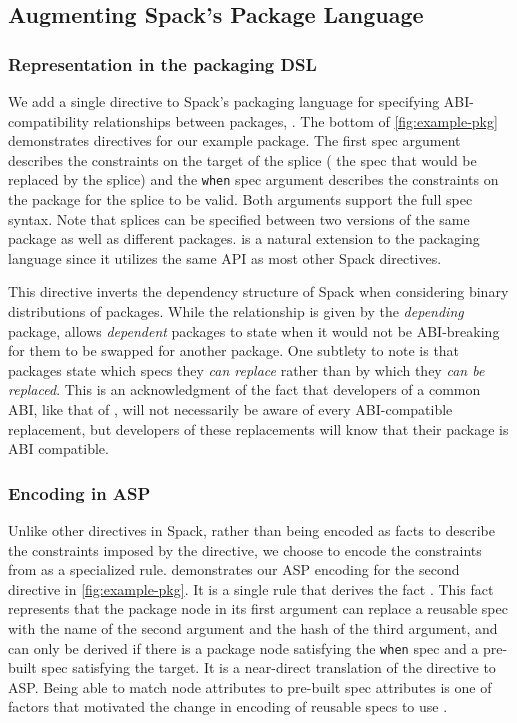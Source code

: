 \subsection{Augmenting Spack's Package Language}
\label{sec:impl-new-directive}
\subsubsection{Representation in the packaging DSL}
We add a single directive to Spack's packaging language for specifying
ABI-compatibility relationships between packages, .  The
bottom of \cref{fig:example-pkg} demonstrates  directives
for our example package. The first spec argument describes the constraints on
the target of the splice (\ie{} the spec that would be replaced by the splice) and
the \texttt{when} spec argument describes the constraints on the package for the
splice to be valid. Both arguments support the full spec syntax. Note that
splices can be specified between two versions of the same package as well as
different packages.  is a natural extension to the
packaging language since it utilizes the same API as most other Spack
directives.

This directive inverts the dependency structure of Spack when
considering binary distributions of packages. While the 
relationship is given by the \emph{depending} package,  allows
\emph{dependent} packages to state when it would not be ABI-breaking for them to
be swapped for another package. One subtlety to note is that packages state which
specs they \emph{can replace} rather than by which they \emph{can be replaced}.
This is an acknowledgment of the fact that developers of a common ABI, like
that of , will not necessarily be aware of every ABI-compatible
replacement, but developers of these replacements will know that their package
is ABI compatible.

\subsubsection{Encoding in ASP}
Unlike other directives in Spack, rather than being encoded as facts to describe
the constraints imposed by the  directive, we choose to
encode the constraints from  as a specialized rule.
 demonstrates our ASP encoding for the second
 directive in \cref{fig:example-pkg}. It is a single rule
that derives the fact . This fact represents that the package
node in its first argument can replace a reusable spec with the name of the
second argument and the hash of the third argument, and can only be derived if
there is a package node satisfying the \texttt{when} spec and a pre-built spec
satisfying the target. It is a near-direct translation of the
 directive to ASP. Being able to match node attributes to
pre-built spec attributes is one of factors that motivated the change in
encoding of reusable specs to use .

